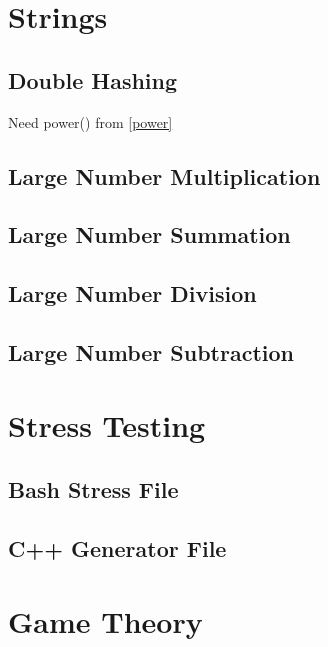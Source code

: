 \documentclass[10pt, a4paper,twocolumn]{article}
\begin{document}
\section{Strings}
\subsection{Double Hashing}
Need power() from \ref{power}


\subsection{Large Number Multiplication}


\subsection{Large Number Summation}


\subsection{Large Number Division}


\subsection{Large Number Subtraction}


\section{Stress Testing}
\subsection{Bash Stress File}


\subsection{C++ Generator File}


\section{Game Theory}
\end{document}
